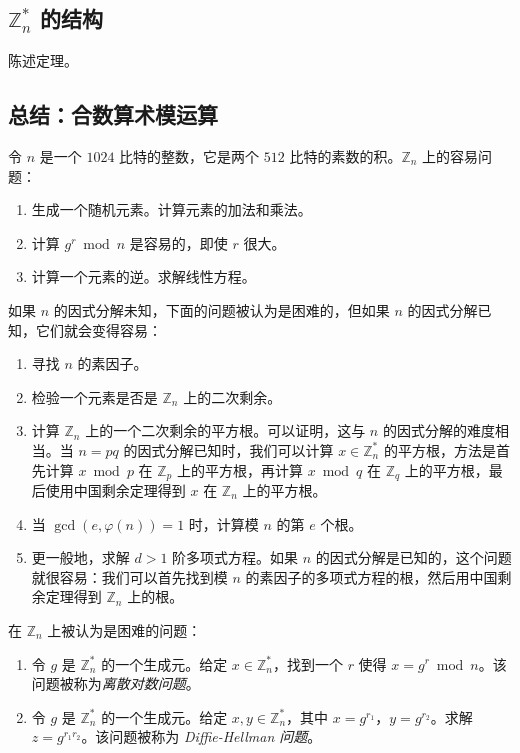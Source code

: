 \subsection{$\mathbb{Z}_n^*$ 的结构}\label{subsec:A-3-2}

\begin{theorem}[中国剩余定理]\label{theo:A-1}
陈述定理。
\end{theorem}

\subsection{总结：合数算术模运算}\label{subsec:A-3-3}

令 $n$ 是一个 $1024$ 比特的整数，它是两个 $512$ 比特的素数的积。$\mathbb{Z}_n$ 上的容易问题：
\begin{enumerate}
	\item 生成一个随机元素。计算元素的加法和乘法。
	\item 计算 $g^r \bmod n$ 是容易的，即使 $r$ 很大。
	\item 计算一个元素的逆。求解线性方程。
\end{enumerate}

如果 $n$ 的因式分解未知，下面的问题被认为是困难的，但如果 $n$ 的因式分解已知，它们就会变得容易：
\begin{enumerate}
	\item 寻找 $n$ 的素因子。
	\item 检验一个元素是否是 $\mathbb{Z}_n$ 上的二次剩余。
	\item 计算 $\mathbb{Z}_n$ 上的一个二次剩余的平方根。可以证明，这与 $n$ 的因式分解的难度相当。当 $n=pq$ 的因式分解已知时，我们可以计算 $x\in\mathbb{Z}_n^*$ 的平方根，方法是首先计算 $x \bmod p$ 在 $\mathbb{Z}_p$ 上的平方根，再计算 $x \bmod q$ 在 $\mathbb{Z}_q$ 上的平方根，最后使用中国剩余定理得到 $x$ 在 $\mathbb{Z}_n$ 上的平方根。
	\item 当 $\gcd(e,\varphi(n))=1$ 时，计算模 $n$ 的第 $e$ 个根。
	\item 更一般地，求解 $d>1$ 阶多项式方程。如果 $n$ 的因式分解是已知的，这个问题就很容易：我们可以首先找到模 $n$ 的素因子的多项式方程的根，然后用中国剩余定理得到 $\mathbb{Z}_n$ 上的根。
\end{enumerate}

在 $\mathbb{Z}_n$ 上被认为是困难的问题：
\begin{enumerate}
	\item 令 $g$ 是 $\mathbb{Z}_n^*$ 的一个生成元。给定 $x\in\mathbb{Z}_n^*$，找到一个 $r$ 使得 $x=g^r \bmod n$。该问题被称为\emph{离散对数问题}。
	\item 令 $g$ 是 $\mathbb{Z}_n^*$ 的一个生成元。给定 $x,y\in\mathbb{Z}_n^*$，其中 $x=g^{r_1}$，$y=g^{r_2}$。求解 $z=g^{r_1r_2}$。该问题被称为 \emph{Diffie-Hellman 问题}。
\end{enumerate}